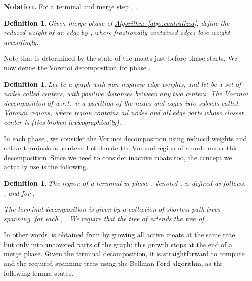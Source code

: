 \documentclass[letterpaper,11pt]{article}
\newtheorem{definition}[theorem]{Definition}
\newcommand{\namedref}[2]{\hyperref[#2]{#1~\ref*{#2}}}
\newcommand{\algref}[1]{\namedref{Algorithm}{#1}}
\begin{document}
\smallskip\noindent\textbf{Notation.} For a terminal  and merge step , 
.

\begin{definition}Given merge phase  of \algref{algo:centralized}, define the
  \emph{reduced weight} of an edge  by , where fractionally contained edges lose
  weight accordingly.
\end{definition}
Note that  is determined by the state of the moats just
before phase  starts. We now define the Voronoi decomposition for phase .
\begin{definition}
  Let  be a graph with non-negative edge weights, and let
   be a set of nodes called \emph{centers},
  with positive distances
  between any two centers. The \emph{Voronoi decomposition} of  w.r.t.\ 
  is a partition of the nodes and edges into  subsets called \emph{Voronoi
  regions}, where region  contains all nodes and all edge parts
  whose closest center is  (ties broken lexicographically).
\end{definition}

In each phase , we consider the Voronoi decomposition using reduced
weights  and active terminals
as centers. Let  denote
the Voronoi region of a node  under this decomposition.
Since we need to consider inactive moats too,  the concept we actually
use is the following. 
\begin{definition}
  The \emph{region} of a
  terminal  in phase , denoted , is defined as
  follows. 
  , and for ,

The  terminal decomposition is given by a collection of
shortest-path-trees spanning, for each , . We require that
the tree of  extends the tree of .
\end{definition}

In other words,  is obtained from  by growing all
active moats at the same rate, but only into uncovered parts of the graph; this growth
stops at the end of a merge phase. Given the  terminal
decomposition, it 
is straightforward to compute  and the required spanning trees
using the Bellman-Ford algorithm, as the following lemma states.
\end{document}
